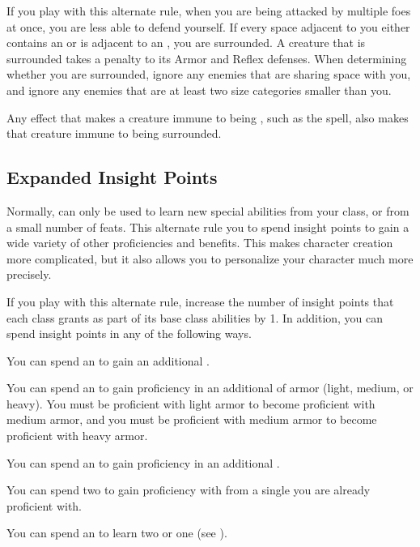         If you play with this alternate rule, when you are being attacked by multiple foes at once, you are less able to defend yourself.
        If every space adjacent to you either contains an  or is adjacent to an , you are surrounded.
        A creature that is surrounded takes a  penalty to its Armor and Reflex defenses.
        When determining whether you are surrounded, ignore any enemies that are sharing space with you, and ignore any enemies that are at least two size categories smaller than you.

        Any effect that makes a creature immune to being \partiallyunaware, such as the  spell, also makes that creature immune to being surrounded.

    \subsection{Expanded Insight Points}
        Normally,  can only be used to learn new special abilities from your class, or from a small number of feats.
        This alternate rule you to spend insight points to gain a wide variety of other proficiencies and benefits.
        This makes character creation more complicated, but it also allows you to personalize your character much more precisely.

        If you play with this alternate rule, increase the number of insight points that each class grants as part of its base class abilities by 1.
        In addition, you can spend insight points in any of the following ways.
        \begin{raggeditemize}
            \item You can spend an  to gain an additional .
            \item You can spend an  to gain proficiency in an additional  of armor (light, medium, or heavy).
                You must be proficient with light armor to become proficient with medium armor, and you must be proficient with medium armor to become proficient with heavy armor.
            \item You can spend an  to gain proficiency in an additional .
            \item You can spend two  to gain proficiency with  from a single  you are already proficient with.
            \item You can spend an  to learn two  or one  (see ).
        \end{raggeditemize}

